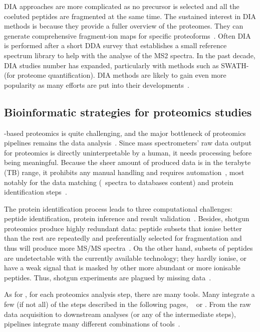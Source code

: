 \gls{DIA} approaches are more complicated
as no precursor is selected and
all the coeluted peptides are fragmented at the same time.
The sustained interest in \gls{DIA} methods is because
they provide a fuller overview of the proteomes.
They can generate comprehensive fragment-ion maps for
specific proteoforms~.
Often \gls{DIA} is performed after a short \gls{DDA} survey
that establishes a small reference spectrum library
to help with the analyse of the MS2 spectra.
In the past decade, \gls{DIA} studies number has expanded,
particularly with methods such as SWATH-\ms~
(for proteome quantification).
\gls{DIA} methods are likely to gain even more popularity
as many efforts are put into their developments~.

\subsection{Bioinformatic strategies for proteomics studies}

\ms-based proteomics is quite challenging,
and the major bottleneck of proteomics pipelines remains
the data analysis~.
Since mass spectrometers' raw data output
for proteomics is directly uninterpretable by a human,
it needs processing before being meaningful.
Because the sheer amount of produced data is in the terabyte (\gls{TB}) range,
it prohibits any manual handling and requires automation~,
most notably for the data matching (\ms\ spectra to databases content) and
protein identification steps~.

The protein identification process leads to three computational challenges:
peptide identification, protein inference and result validation~.
Besides, shotgun proteomics produce highly redundant data:
peptide subsets that ionise better than the rest
are repeatedly and preferentially selected for fragmentation
and thus will produce more \gls{MS/MS} spectra~.
On the other hand,
subsets of peptides are undetectable with the currently available technology;
they hardly ionise, or have a weak signal that is masked
by other more abundant or more ionisable peptides.
Thus, shotgun experiments are plagued by missing data~.

As for \Rnaseq, for each proteomics analysis step,
there are many tools.
Many integrate a few (if not all) of the steps described in the following pages,
\eg\ 
or .
From the raw data acquisition to downstream analyses
(or any of the intermediate steps),
pipelines integrate many different combinations of tools~.

